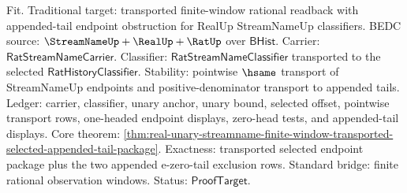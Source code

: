 Fit. Traditional target: transported finite-window rational readback with
appended-tail endpoint obstruction for RealUp StreamNameUp classifiers. BEDC
source: $\StreamNameUp+\RealUp+\RatUp$ over $\mathsf{BHist}$. Carrier:
$\mathsf{RatStreamNameCarrier}$. Classifier:
$\mathsf{RatStreamNameClassifier}$ transported to the selected
$\mathsf{RatHistoryClassifier}$. Stability: pointwise $\hsame$ transport of
StreamNameUp endpoints and positive-denominator transport to appended tails.
Ledger: carrier, classifier, unary anchor, unary bound, selected offset,
pointwise transport rows, one-headed endpoint displays, zero-head tests, and
appended-tail displays. Core theorem:
\autoref{thm:real-unary-streamname-finite-window-transported-selected-appended-tail-package}.
Exactness: transported selected endpoint package plus the two appended
e-zero-tail exclusion rows. Standard bridge: finite rational observation
windows. Status: $\mathsf{ProofTarget}$.
